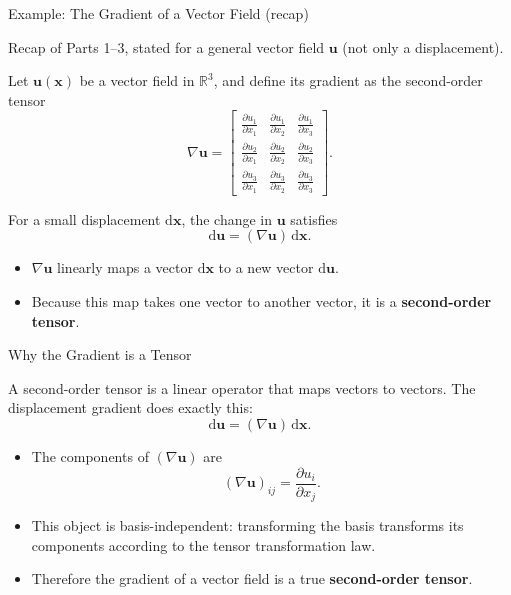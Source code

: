 \documentclass[aspectratio=169,11pt]{beamer}
\begin{document}
\begin{frame}{Example: The Gradient of a Vector Field (recap)}

{\footnotesize\color{DarkGray}Recap of Parts 1--3, stated for a general vector field $\mathbf{u}$ (not only a displacement).\par}

Let $\mathbf{u}(\mathbf{x})$ be a vector field in $\mathbb{R}^3$, and define its
gradient as the second-order tensor
\[
\nabla \mathbf{u} 
= 
\begin{bmatrix}
\frac{\partial u_1}{\partial x_1} &
\frac{\partial u_1}{\partial x_2} &
\frac{\partial u_1}{\partial x_3} \\[6pt]
\frac{\partial u_2}{\partial x_1} &
\frac{\partial u_2}{\partial x_2} &
\frac{\partial u_2}{\partial x_3} \\[6pt]
\frac{\partial u_3}{\partial x_1} &
\frac{\partial u_3}{\partial x_2} &
\frac{\partial u_3}{\partial x_3}
\end{bmatrix}.
\]

For a small displacement $\mathrm{d}\mathbf{x}$, the change in $\mathbf{u}$ satisfies
\[
\mathrm{d}\mathbf{u}
= (\nabla \mathbf{u})\, \mathrm{d}\mathbf{x}.
\]

\vspace{0.2cm}
\begin{itemize}
\item $\nabla \mathbf{u}$ linearly maps a vector $\mathrm{d}\mathbf{x}$ to a new vector $\mathrm{d}\mathbf{u}$.
\item Because this map takes one vector to another vector, it is a \textbf{second-order tensor}.
\end{itemize}

\end{frame}

\begin{frame}{Why the Gradient is a Tensor}

A second-order tensor is a linear operator that maps vectors to vectors.  
The displacement gradient does exactly this:
\[
\mathrm{d}\mathbf{u} = (\nabla \mathbf{u})\,\mathrm{d}\mathbf{x}.
\]

\begin{itemize}
\item The components of $(\nabla \mathbf{u})$ are
\[
(\nabla \mathbf{u})_{ij} = 
\frac{\partial u_i}{\partial x_j}.
\]
\item This object is basis-independent: transforming the basis transforms its components according to the tensor transformation law.
\item Therefore the gradient of a vector field is a true \textbf{second-order tensor}.
\end{itemize}

\end{frame}
\end{document}
